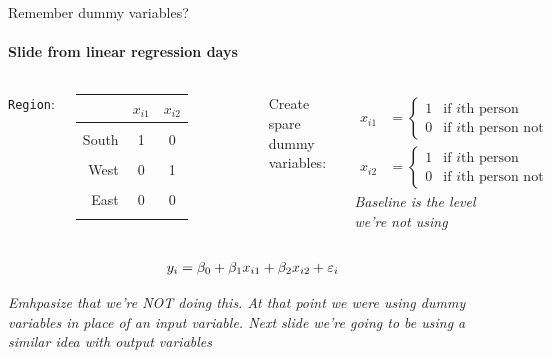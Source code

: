 \documentclass[aspectratio=169,usenames,dvipsnames]{beamer}
\newcommand{\InstructorNotes}[1]{\textit{\color{orange}#1}}
\begin{document}
\begin{frame}[c]{Remember dummy variables?}
\framesubtitle{Slide from linear regression days}

	\begin{columns}
	\centering
	\texttt{Region}:
	
	\qquad
	
	\begin{tabular}{r|cc}
		 & $x_{i1}$ & $x_{i2}$ \\ \hline
		 & \\
		South & {1 } & {0} \\
		\\
		West & {0 } & {1}\\
		\\
		East& {0 } & {0}\\
		&
	\end{tabular}
	
	
	\centering
	Create spare dummy variables:
	
	\begin{align*}
			x_{i1} &=
		\begin{cases}
			1 & \text{if $i$th person from South}\\
			0 & \text{if $i$th person not from South}
		\end{cases}\\
			x_{i2} &=
		\begin{cases}
			1 & \text{if $i$th person from West}\\
			0 & \text{if $i$th person not from West}
		\end{cases}
	\end{align*}
	\InstructorNotes{Baseline is the level we're not using}
	
	\end{columns}
	
	
	\begin{align*}
	y_i &= \beta_0 + \beta_1x_{i1}+ \beta_2x_{i2}+\varepsilon_i
	\end{align*}
	
	\InstructorNotes{Emhpasize that we're NOT doing this. At that point we were using dummy variables in place of an input variable. Next slide we're going to be using a similar idea with output variables}
	\end{frame}
\end{document}
